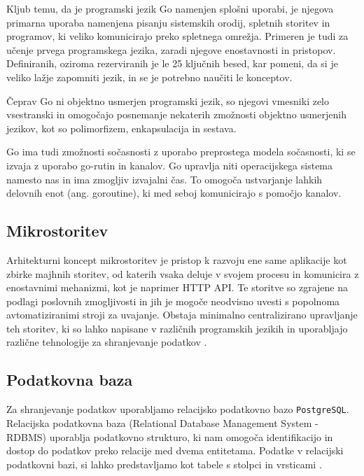 \documentclass[a4paper, 12pt]{book}
\begin{document}
Kljub temu, da je programski jezik Go namenjen splošni uporabi, je njegova primarna uporaba namenjena pisanju sistemskih orodij, spletnih storitev in programov, ki veliko komunicirajo preko  spletnega omrežja. Primeren je tudi za učenje prvega programskega jezika, zaradi njegove enostavnosti in pristopov. Definiranih, oziroma rezerviranih je le 25 ključnih besed, kar pomeni, da si je veliko lažje zapomniti jezik, in se je potrebno naučiti le konceptov.

Čeprav Go ni objektno usmerjen programski jezik, so njegovi vmesniki zelo vsestranski in omogočajo posnemanje nekaterih zmožnosti objektno usmerjenih jezikov, kot so polimorfizem, enkapsulacija in sestava.

Go ima tudi zmožnosti sočasnosti z uporabo preprostega modela sočasnosti, ki se izvaja z uporabo go-rutin in kanalov. Go upravlja niti operacijskega sistema namesto nas in ima zmogljiv izvajalni čas. To omogoča ustvarjanje lahkih delovnih enot (ang. goroutine), ki med seboj komunicirajo s pomočjo kanalov.
 
\subsection{Mikrostoritev}
Arhitekturni koncept mikrostoritev je pristop k razvoju ene same aplikacije kot zbirke majhnih storitev, od katerih vsaka deluje v svojem procesu in komunicira z enostavnimi mehanizmi, kot je naprimer HTTP API. Te storitve so zgrajene na podlagi poslovnih zmogljivosti in jih je mogoče neodvisno uvesti s popolnoma avtomatiziranimi stroji za uvajanje. Obstaja minimalno centralizirano upravljanje teh storitev, ki so lahko napisane v različnih programskih jezikih in uporabljajo različne tehnologije za shranjevanje podatkov \cite{mfowler-microservices}. 


\subsection{Podatkovna baza}
Za shranjevanje podatkov uporabljamo relacijsko podatkovno bazo \verb=PostgreSQL=. Relacijska podatkovna baza (Relational Database Management System - RDBMS) uporablja podatkovno strukturo, ki nam omogoča identifikacijo in dostop do podatkov preko relacije med dvema entitetama. Podatke v relacijski podatkovni bazi, si lahko predstavljamo kot tabele s stolpci in vrsticami \cite{oracle-rdbms}.


\end{document}
